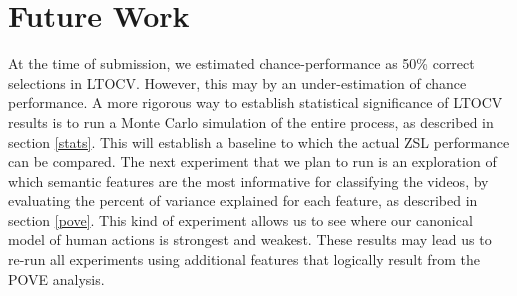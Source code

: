 \documentclass{article}
\begin{document}
\section{Future Work} %
At the time of submission, we estimated chance-performance as 50\% correct selections in LTOCV.  However, this may by an under-estimation of chance performance. A more rigorous way to establish statistical significance of LTOCV results is to run a Monte Carlo simulation of the entire process, as described in section \ref{stats}. This will establish a baseline to which the actual ZSL performance can be compared.
The next experiment that we plan to run is an exploration of which semantic features are the most informative for classifying the videos, by evaluating the percent of variance explained for each feature, as described in section \ref{pove}. This kind of experiment allows us to see where our canonical model of human actions is strongest and weakest. These results may lead us to re-run all experiments using additional features that logically result from the POVE analysis.


\end{document}
